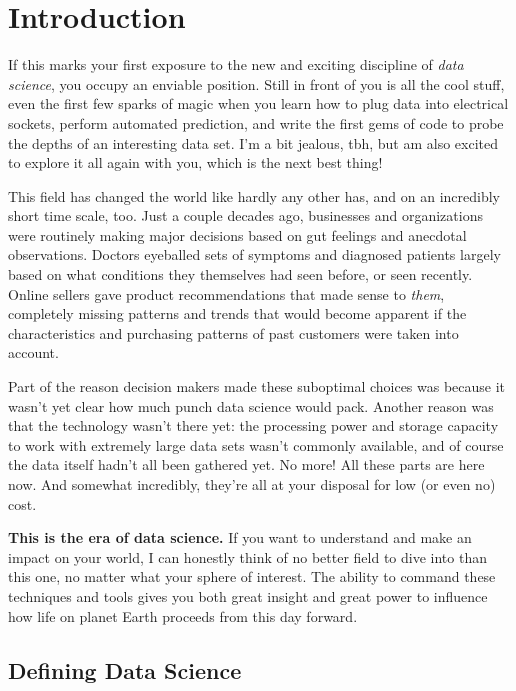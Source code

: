 
\chapter{Introduction}
\label{ch:intro}

If this marks your first exposure to the new and exciting discipline of
\textit{data science}, you occupy an enviable position. Still in front of you
is all the cool stuff, even the first few sparks of magic when you learn how to
plug data into electrical sockets, perform automated prediction, and write the
first gems of code to probe the depths of an interesting data set. I'm a bit
jealous, tbh, but am also excited to explore it all again with you, which is
the next best thing!

This field has changed the world like hardly any other has, and on an
incredibly short time scale, too. Just a couple decades ago, businesses and
organizations were routinely making major decisions based on gut feelings and
anecdotal observations. Doctors eyeballed sets of symptoms and diagnosed
patients largely based on what conditions they themselves had seen before, or
seen recently. Online sellers gave product recommendations that made sense to
\textit{them}, completely missing patterns and trends that would become
apparent if the characteristics and purchasing patterns of past customers were
taken into account.

Part of the reason decision makers made these suboptimal choices was because it
wasn't yet clear how much punch data science would pack. Another reason was
that the technology wasn't there yet: the processing power and storage capacity
to work with extremely large data sets wasn't commonly available, and of course
the data itself hadn't all been gathered yet. No more! All these parts are here
now. And somewhat incredibly, they're all at your disposal for low (or even no)
cost.

\textbf{This is the era of data science.} If you want to understand and make an
impact on your world, I can honestly think of no better field to dive into than
this one, no matter what your sphere of interest. The ability to command these
techniques and tools gives you both great insight and great power to influence
how life on planet Earth proceeds from this day forward.

\section{Defining Data Science}

